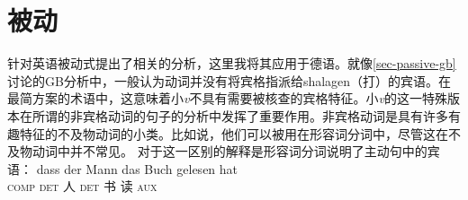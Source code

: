 \section{被动}

 \citet{Adger2003a} 针对英语被动式提出了相关的分析，这里我将其应用于德语。就像\ref{sec-passive-gb}讨论的GB分析中，一般认为动词并没有将宾格指派给shalagen（打）的宾语。在最简方案的术语中，这意味着小\emph{v}不具有需要被核查的宾格特征。小\emph{v}的这一特殊版本在所谓的非宾格动词的句子的分析中发挥了重要作用\citep{Perlmutter78}。非宾格动词是具有许多有趣特征的不及物动词的小类。比如说，他们可以被用在形容词分词中，尽管这在不及物动词中并不常见。
\eal
{}
\zl
对于这一区别的解释是形容词分词说明了主动句中的宾语：
\eal
\ex
\gll dass der Mann das Buch gelesen hat\\
     \textsc{comp} \textsc{det} 人  \textsc{det} 书 读 \textsc{aux}\\
